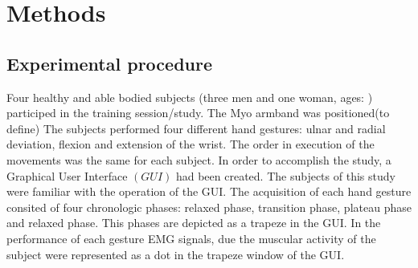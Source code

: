 \section {Methods}

\subsection {Experimental procedure}
Four healthy and able bodied subjects (three men and one woman, ages:%
) participed in the training session/study. The Myo armband was positioned(to define) The subjects performed four different hand gestures: ulnar and radial deviation, flexion and extension of the wrist. The order in execution of the movements was the same for each subject. In order to accomplish the study, a Graphical User Interface $\left( GUI\right)$ had been created. The subjects of this study were familiar with the operation of the GUI. The acquisition of each hand gesture consited of four chronologic phases: relaxed phase, transition phase, plateau phase and relaxed phase. This phases are depicted as a trapeze in the GUI. In the performance of each gesture EMG signals, due the muscular activity of the subject were represented as a dot in the trapeze window of the GUI.  